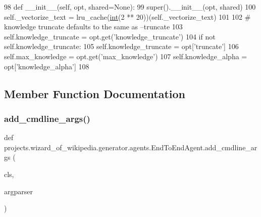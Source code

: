 \begin{DoxyCode}
98     \textcolor{keyword}{def }\_\_init\_\_(self, opt, shared=None):
99         super().\_\_init\_\_(opt, shared)
100         self.\_vectorize\_text = lru\_cache(\hyperlink{namespacelanguage__model_1_1eval__ppl_a7d12ee00479673c5c8d1f6d01faa272a}{int}(2 ** 20))(self.\_vectorize\_text)
101 
102         \textcolor{comment}{# knowledge truncate defaults to the same as --truncate}
103         self.knowledge\_truncate = opt.get(\textcolor{stringliteral}{'knowledge\_truncate'})
104         \textcolor{keywordflow}{if} \textcolor{keywordflow}{not} self.knowledge\_truncate:
105             self.knowledge\_truncate = opt[\textcolor{stringliteral}{'truncate'}]
106         self.max\_knowledge = opt.get(\textcolor{stringliteral}{'max\_knowledge'})
107         self.knowledge\_alpha = opt[\textcolor{stringliteral}{'knowledge\_alpha'}]
108 
\end{DoxyCode}


\subsection{Member Function Documentation}
\mbox{\label{classprojects_1_1wizard__of__wikipedia_1_1generator_1_1agents_1_1EndToEndAgent_ad602e5c8fc8c07391faa8730b665eb7c}} 
\subsubsection{\texorpdfstring{add\+\_\+cmdline\+\_\+args()}{add\_cmdline\_args()}}
{\footnotesize\ttfamily def projects.\+wizard\+\_\+of\+\_\+wikipedia.\+generator.\+agents.\+End\+To\+End\+Agent.\+add\+\_\+cmdline\+\_\+args (\begin{DoxyParamCaption}\item[{}]{cls,  }\item[{}]{argparser }\end{DoxyParamCaption})}



